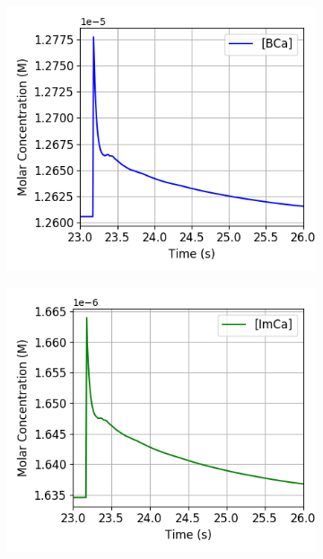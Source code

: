 \documentclass[a4paper,12pt]{article}
\theoremstyle{definition}
\begin{document}
\begin{figure}[h]
  \begin{subfigure}{0.3\textwidth}
    \includegraphics[width=\textwidth]{figures/concentration_dynamics_18_zoomed_BCa.png}
    \caption{}
  \end{subfigure}
  \begin{subfigure}{0.3\textwidth}
    \includegraphics[width=\textwidth]{figures/concentration_dynamics_18_zoomed_ImCa.png}
    \caption{}
  \end{subfigure}
  \begin{subfigure}{0.3\textwidth}

\end{subfigure}
\end{figure}
\end{document}
